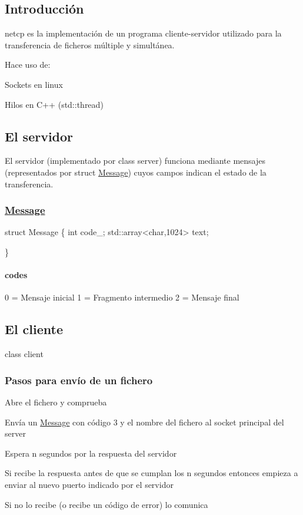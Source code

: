 \subsection*{Introducción}

{\ttfamily netcp} es la implementación de un programa cliente-\/servidor utilizado para la transferencia de ficheros múltiple y simultánea.

Hace uso de\+:
\begin{DoxyItemize}
\item Sockets en linux
\item Hilos en C++ ({\ttfamily std\+::thread})
\end{DoxyItemize}

\subsection*{El servidor}

El servidor (implementado por {\ttfamily class server}) funciona mediante mensajes (representados por {\ttfamily struct \hyperlink{structMessage}{Message}}) cuyos campos indican el estado de la transferencia. \subsubsection*{\hyperlink{structMessage}{Message}}


\begin{DoxyCode}
struct Message \{
  int code\_;
  std::array<char,1024> text;

\}
\end{DoxyCode}
 \paragraph*{codes}

0 = Mensaje inicial 1 = Fragmento intermedio 2 = Mensaje final

\subsection*{El cliente}

{\ttfamily class client} \subsubsection*{Pasos para envío de un fichero}


\begin{DoxyEnumerate}
\item Abre el fichero y comprueba
\item Envía un \hyperlink{structMessage}{Message} con código 3 y el nombre del fichero al socket principal del server
\item Espera n segundos por la respuesta del servidor
\item 
\begin{DoxyItemize}
\item Si recibe la respuesta antes de que se cumplan los n segundos entonces empieza a enviar al nuevo puerto indicado por el servidor
\item Si no lo recibe (o recibe un código de error) lo comunica
\end{DoxyItemize}
\end{DoxyEnumerate}

